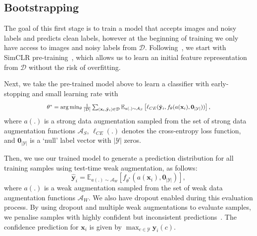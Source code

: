 \documentclass[10pt,twocolumn,letterpaper]{article}
\begin{document}
\subsection{Bootstrapping}
\label{sec:bootstrapping}

The goal of this first stage is to train a model that accepts images and noisy labels and predicts clean labels, however at the beginning of training we only have access to images and noisy labels from $\mathcal{D}$. 
Following~\cite{van2020scan, zheltonozhskii2022contrast}, we start with SimCLR pre-training~\cite{chen2020simple}, which allows us to learn an initial feature representation from $\mathcal{D}$ without the risk of overfitting.


Next, we take the pre-trained model above to learn a classifier with early-stopping and small learning rate with
\begin{equation}
\scalebox{0.85}{$
    \theta^* = \arg\min_{\theta}\frac{1}{|\mathcal{D}|}\sum_{(\mathbf{x}_i,\tilde{\mathbf{y}}_i) \in \mathcal{D}} \mathbb{E}_{a(.) \sim \mathcal{A}_S}\left [\ell_{CE}(\tilde{\mathbf{y}}_i,f_{\theta}(a(\mathbf{x}_i),\mathbf{0}_{|\mathcal{Y}|}))\right ],
    $}
    \label{eq:train_strong_aug}
\end{equation}
where $a(.)$ is a strong data augmentation sampled from the set of strong data augmentation functions $\mathcal{A}_S$,  $\ell_{CE}(.)$ denotes the cross-entropy loss function, and $\mathbf{0}_{|\mathcal{Y}|}$ is a `null' label vector with $|\mathcal{Y}|$ zeros.

Then, we use our trained model to generate a prediction distribution for all training samples using test-time weak augmentation, as follows:
\begin{equation}
    \hat{\mathbf{y}}_i = \mathbb{E}_{a(.) \sim \mathcal{A}_W}\left [ f_{\theta^{*}}(a(\mathbf{x}_i),\mathbf{0}_{|\mathcal{Y}|}) \right ],
    \label{eq:evaluate_weak_aug}
\end{equation}
where $a(.)$ is a weak augmentation sampled from the set of weak data augmentation functions $\mathcal{A}_W$. We also have dropout enabled during this evaluation process. By using dropout and multiple weak augmentations to evaluate samples, we penalise samples with highly confident but inconsistent predictions~\cite{zhang2021learning}. 
The confidence prediction for $\mathbf{x}_i$ is given by $\max_{c \in \mathcal{Y}} \hat{\mathbf{y}}_i(c)$. 
\end{document}
